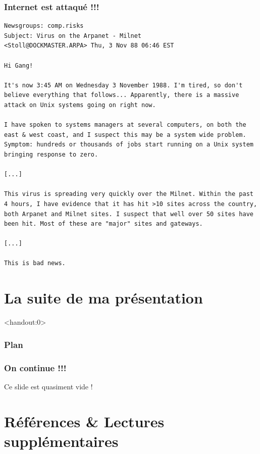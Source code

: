 \begin{frame}[fragile]
  \frametitle{Internet est attaqué !!!}
\vspace{-.25em}
{\footnotesize
\begin{verbatim}
Newsgroups: comp.risks
Subject: Virus on the Arpanet - Milnet
<Stoll@DOCKMASTER.ARPA> Thu, 3 Nov 88 06:46 EST

Hi Gang!

It's now 3:45 AM on Wednesday 3 November 1988. I'm tired, so don't
believe everything that follows... Apparently, there is a massive
attack on Unix systems going on right now.

I have spoken to systems managers at several computers, on both the
east & west coast, and I suspect this may be a system wide problem.
Symptom: hundreds or thousands of jobs start running on a Unix system
bringing response to zero.

[...]

This virus is spreading very quickly over the Milnet. Within the past
4 hours, I have evidence that it has hit >10 sites across the country,
both Arpanet and Milnet sites. I suspect that well over 50 sites have
been hit. Most of these are "major" sites and gateways.

[...]

This is bad news.
\end{verbatim}}
\end{frame}


\section{La suite de ma présentation}

\begin{frame}<handout:0>
  \frametitle{Plan}
  \tableofcontents[currentsection]
\end{frame}

\begin{frame}
  \frametitle{On continue !!!}

  \vfill
  Ce slide est quasiment vide !
  \vfill

\end{frame}


\section{Références \& Lectures supplémentaires}

